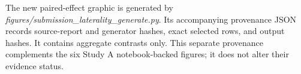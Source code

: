 \documentclass[11pt,letterpaper]{article}
\begin{document}
The new paired-effect graphic is generated by
\emph{figures/submission\_laterality\_generate.py}. Its accompanying
provenance JSON records source-report and generator hashes, exact
selected rows, and output hashes. It contains aggregate contrasts only.
This separate provenance complements the six Study A notebook-backed
figures; it does not alter their evidence status.
\end{document}

